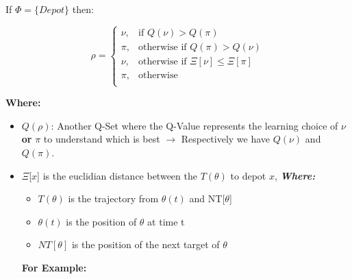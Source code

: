 \documentclass[12pt]{article}
\begin{document}
\begin{itemize}
\begin{enumerate}
        If $\Phi = \{Depot\}$ then:
        
        \[
            \rho = 
            \begin{cases}
                \nu,& \text{if }  Q(\nu) > Q(\pi) \\
                \pi,& \text{otherwise if } Q(\pi) > Q(\nu) \\
                \nu,& \text{otherwise if } \Xi[\nu] \leq \Xi[\pi] \\
                \pi,& \text{otherwise} \\
            \end{cases}
        \]    
            
        \textbf{Where:}
        
        \begin{itemize}
        
            \item $Q(\rho)$: Another Q-Set where the Q-Value represents the learning choice of $\nu$ \textbf{or} $\pi$ to understand which is best $\rightarrow$ Respectively we have $Q(\nu)$ and $Q(\pi)$.
        
            \item  $\Xi$[$x$] is the euclidian distance between the $T(\theta)$ to depot $x$, \textbf{\textit{Where:}}
            
            \begin{itemize}
            
                \item $T(\theta)$ is the trajectory from $\theta(t)$ and NT[$\theta$]
            
                 \item $\theta(t)$ is the position of $\theta$ at time t
            
                \item $NT[\theta]$ is the position of the next target of $\theta$
                       
            
            \end{itemize}
            
            \textbf{For Example:}
        
\end{itemize}
\end{enumerate}
\end{itemize}
\end{document}

